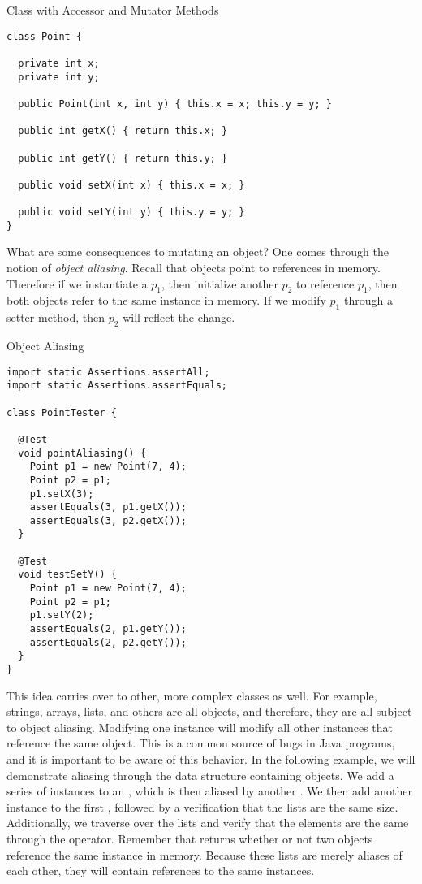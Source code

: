 \begin{cl}{ Class with Accessor and Mutator Methods}
\begin{lstlisting}[language=MyJava]
class Point {

  private int x;
  private int y;

  public Point(int x, int y) { this.x = x; this.y = y; }

  public int getX() { return this.x; }

  public int getY() { return this.y; }

  public void setX(int x) { this.x = x; }

  public void setY(int y) { this.y = y; }
}
\end{lstlisting}
\end{cl}

What are some consequences to mutating an object? One comes through the notion of \textit{object aliasing}. Recall that objects point to references in memory. Therefore if we instantiate a  $p_1$, then initialize another  $p_2$ to reference $p_1$, then both objects refer to the same  instance in memory. If we modify $p_1$ through a setter method, then $p_2$ will reflect the change.

\begin{cl}{Object Aliasing}
\begin{lstlisting}[language=MyJava]
import static Assertions.assertAll;
import static Assertions.assertEquals;

class PointTester {

  @Test
  void pointAliasing() {
    Point p1 = new Point(7, 4);
    Point p2 = p1;
    p1.setX(3);
    assertEquals(3, p1.getX());
    assertEquals(3, p2.getX());
  }

  @Test
  void testSetY() {
    Point p1 = new Point(7, 4);
    Point p2 = p1;
    p1.setY(2);
    assertEquals(2, p1.getY());
    assertEquals(2, p2.getY());
  }
}
\end{lstlisting}
\end{cl}

This idea carries over to other, more complex classes as well. For example, strings, arrays, lists, and others are all objects, and therefore, they are all subject to object aliasing. Modifying one  instance will modify all other  instances that reference the same object. This is a common source of bugs in Java programs, and it is important to be aware of this behavior. In the following example, we will demonstrate aliasing through the  data structure containing  objects. We add a series of  instances to an , which is then aliased by another . We then add another  instance to the first , followed by a verification that the lists are the same size. Additionally, we traverse over the lists and verify that the elements are the same through the \ttt{==} operator. Remember that \ttt{==} returns whether or not two objects reference the same instance in memory. Because these lists are merely aliases of each other, they will contain references to the same  instances.

